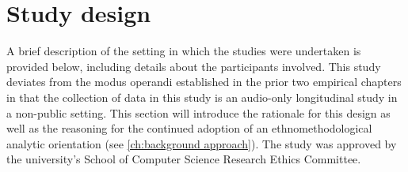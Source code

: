 







\section{Study design}\label{sec:empirical home design}
\begin{revisedsubmission}
A brief description of the setting in which the studies were undertaken is provided below, including details about the participants involved.
This study deviates from the modus operandi established in the prior two empirical chapters in that the collection of data in this study is an audio-only longitudinal study in a non-public setting.
This section will introduce the rationale for this design as well as the reasoning for the continued adoption of an ethnomethodological analytic orientation (see \autoref{ch:background approach}).
The study was approved by the university's School of Computer Science Research Ethics Committee.
\end{revisedsubmission}



